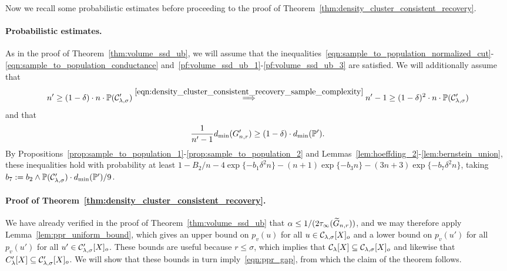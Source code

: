 Now we recall some probabilistic estimates before proceeding to the proof of Theorem~\ref{thm:density_cluster_consistent_recovery}.

\paragraph{Probabilistic estimates.}
As in the proof of Theorem~\ref{thm:volume_ssd_ub}, we will assume that the inequalities~\eqref{eqn:sample_to_population_normalized_cut}-\eqref{eqn:sample_to_population_conductance} and~\eqref{pf:volume_ssd_ub_1}-\eqref{pf:volume_ssd_ub_3} are satisfied. We will additionally assume that
\begin{equation}
n' \geq (1 - \delta) \cdot n \cdot \mathbb{P}(\mathcal{C}_{\lambda,\sigma}') \overset{\eqref{eqn:density_cluster_consistent_recovery_sample_complexity}}{\Longrightarrow} n' - 1 \geq (1 - \delta)^2 \cdot n \cdot \mathbb{P}(\mathcal{C}_{\lambda,\sigma}')
\end{equation}
and that 
\begin{equation}
\frac{1}{n' - 1} d_{\min}(G_{n,r}') \geq (1 - \delta) \cdot d_{\min}(\mathbb{P}').
\end{equation}
By Propositions~\ref{prop:sample_to_population_1}-\ref{prop:sample_to_population_2} and Lemmas~\ref{lem:hoeffding_2}-\ref{lem:bernstein_union}, these inequalities hold with probability at least $1 - B_2/n - 4\exp\{-b_1\delta^2n\} - (n + 1)\exp\{-b_3n\} - (3n + 3)\exp\{-b_7\delta^2n\}$, taking $b_7 := b_2 \wedge \mathbb{P}(\mathcal{C}_{\lambda,\sigma}') \cdot d_{\min}(\mathbb{P}')/9$.

\paragraph{Proof of Theorem~\ref{thm:density_cluster_consistent_recovery}.}
We have already verified in the proof of Theorem~\ref{thm:volume_ssd_ub} that $\alpha \leq 1/(2\tau_{\infty}(\widetilde{G}_{n,r}))$, and we may therefore apply Lemma~\ref{lem:ppr_uniform_bound}, which gives an upper bound on $p_v(u)$ for all $u \in \mathcal{C}_{\lambda,\sigma}[X]_o$ and a lower bound on $p_v(u')$ for all $p_v(u')$ for all $u' \in \mathcal{C}_{\lambda,\sigma}'[X]_o$. These bounds are useful because $r \leq \sigma$, which implies that $\mathcal{C}_{\lambda}[X] \subseteq\mathcal{C}_{\lambda,\sigma}[X]_o$ and likewise that $C_{\lambda}'[X] \subseteq\mathcal{C}_{\lambda,\sigma}'[X]_o$. We will show that these bounds in turn imply~\eqref{eqn:ppr_gap}, from which the claim of the theorem follows.

